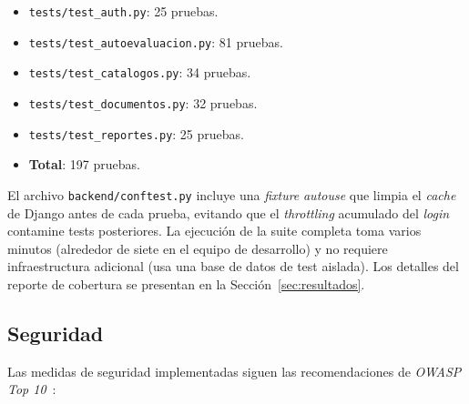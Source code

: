 \begin{itemize}
    \item \texttt{tests/test\_auth.py}: 25 pruebas.
    \item \texttt{tests/test\_autoevaluacion.py}: 81 pruebas.
    \item \texttt{tests/test\_catalogos.py}: 34 pruebas.
    \item \texttt{tests/test\_documentos.py}: 32 pruebas.
    \item \texttt{tests/test\_reportes.py}: 25 pruebas.
    \item \textbf{Total}: 197 pruebas.
\end{itemize}

El archivo \texttt{backend/conftest.py} incluye una \emph{fixture} \emph{autouse} que limpia el \emph{cache} de Django antes de cada prueba, evitando que el \emph{throttling} acumulado del \emph{login} contamine tests posteriores. La ejecución de la suite completa toma varios minutos (alrededor de siete en el equipo de desarrollo) y no requiere infraestructura adicional (usa una base de datos de test aislada). Los detalles del reporte de cobertura se presentan en la Sección~\ref{sec:resultados}.

\subsection{Seguridad}\label{sec:seguridad}

Las medidas de seguridad implementadas siguen las recomendaciones de \emph{OWASP Top 10}~\cite{owasp2021}:

